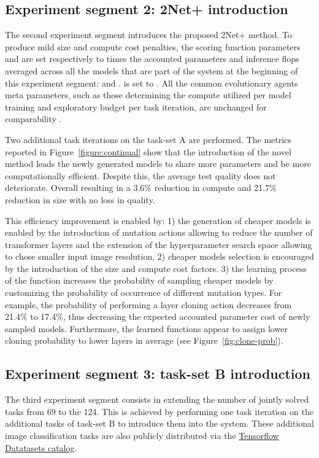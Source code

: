\documentclass{article} \usepackage{iclr2023_conference,times}
\newcommand{\method}{2Net+\xspace}
\begin{document}
\subsection{Experiment segment 2: \method introduction}

The second experiment segment introduces the proposed \method method.
To produce mild size and compute cost penalties, the scoring function parameters  and  are set respectively to  times the accounted parameters and inference flops averaged across all the models that are part of the system at the beginning of this experiment segment:  and .
 is set to .
All the common evolutionary agents meta parameters, such as those determining the compute utilized per model training and exploratory budget per task iteration, are unchanged for comparability \citep{Gesmundo2022munet2}. 

Two additional task iterations on the task-set A are performed. The metrics reported in Figure~\ref{figure:continual} show that
the introduction of the novel method leads the newly generated models to share more parameters and be more computationally efficient.
Despite this, the average test quality does not deteriorate.
Overall resulting in a 3.6\% reduction in compute and 21.7\% reduction in size with no loss in quality.

This efficiency improvement is enabled by:
1) the generation of cheaper models is enabled by the introduction of mutation actions allowing to reduce the number of transformer layers and the extension of the hyperparameter search space allowing to chose smaller input image resolution,  2) cheaper models selection is encouraged by the introduction of the size and compute cost factors. 3) the learning process of the  function increases the probability of sampling cheaper models by customizing the probability of occurrence of different mutation types.
For example, the probability of performing a layer cloning action decreases from 21.4\% to 17.4\%, thus decreasing the expected accounted parameter cost of newly sampled models.
Furthermore, the learned  functions appear to assign lower cloning probability to lower layers in average (see Figure~\ref{fig:clone-prob}).

\subsection{Experiment segment 3: task-set B introduction}

The third experiment segment consists in extending the number of jointly solved tasks from 69 to the 124.
This is achieved by performing one task iteration on the additional  tasks of task-set B to introduce them into the system.
These additional image classification tasks are also publicly distributed via the \href{https://www.tensorflow.org/datasets/catalog/overview}{Tensorflow Datatasets catalog}.
\end{document}
